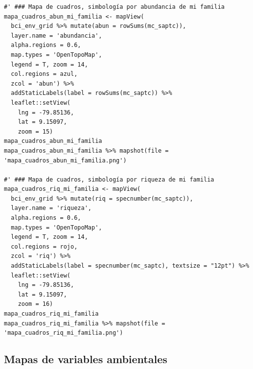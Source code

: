 \documentclass[11pt,]{article}
\begin{document}
\begin{verbatim}
#' ### Mapa de cuadros, simbología por abundancia de mi familia
mapa_cuadros_abun_mi_familia <- mapView(
  bci_env_grid %>% mutate(abun = rowSums(mc_saptc)),
  layer.name = 'abundancia',
  alpha.regions = 0.6,
  map.types = 'OpenTopoMap',
  legend = T, zoom = 14,
  col.regions = azul,
  zcol = 'abun') %>%
  addStaticLabels(label = rowSums(mc_saptc)) %>%
  leaflet::setView(
    lng = -79.85136,
    lat = 9.15097,
    zoom = 15)
mapa_cuadros_abun_mi_familia
mapa_cuadros_abun_mi_familia %>% mapshot(file = 'mapa_cuadros_abun_mi_familia.png')

#' ### Mapa de cuadros, simbología por riqueza de mi familia
mapa_cuadros_riq_mi_familia <- mapView(
  bci_env_grid %>% mutate(riq = specnumber(mc_saptc)),
  layer.name = 'riqueza',
  alpha.regions = 0.6,
  map.types = 'OpenTopoMap',
  legend = T, zoom = 14,
  col.regions = rojo,
  zcol = 'riq') %>%
  addStaticLabels(label = specnumber(mc_saptc), textsize = "12pt") %>%
  leaflet::setView(
    lng = -79.85136,
    lat = 9.15097,
    zoom = 16)
mapa_cuadros_riq_mi_familia
mapa_cuadros_riq_mi_familia %>% mapshot(file = 'mapa_cuadros_riq_mi_familia.png')
\end{verbatim}

\subsection{Mapas de variables
ambientales}\label{mapas-de-variables-ambientales}
\end{document}
